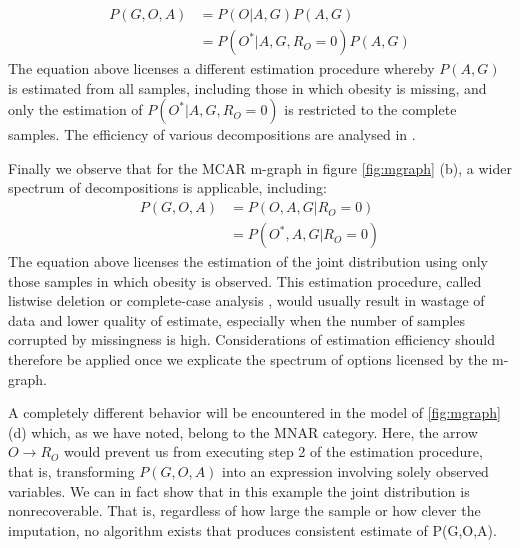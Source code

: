 \documentclass[12pt]{article}
\newcommand{\compos}{\mbox{$\bot\!\!\!\bot$}}
\begin{document}
	\begin{align*}
	P(G,O,A) &= P(O|A,G) P(A,G)\\
	&= P(O^*|A,G,R_O=0) P(A,G)	
	\end{align*}
	The equation above licenses a different estimation procedure whereby $P(A,G)$ is estimated from all samples, including those in which obesity is missing, and only the estimation of $P(O^*|A,G,R_O=0)$ is restricted to the complete samples. %
	The efficiency of various decompositions are analysed in \cite{mohan_learning, closedform}. 
	
	Finally we observe that for the MCAR m-graph in figure \ref{fig:mgraph} (b), a wider spectrum of decompositions is applicable, including:
	\begin{align*}
	P(G,O,A) &= P(O,A,G|R_O=0) \\
	&=	P(O^*,A,G|R_O=0)
	\end{align*}
	The equation above licenses the estimation of the joint distribution using only those samples in which obesity is observed. This  estimation procedure, called listwise deletion or complete-case analysis \citep{Rubin2},  would usually result in wastage of data and lower quality of estimate, especially when the number of samples corrupted by missingness is high. Considerations of estimation efficiency should therefore be applied once we explicate the spectrum of options licensed by the m-graph. 

		A completely different behavior will be encountered
		in the model of \ref{fig:mgraph} (d) which, as we have noted,
		belong to the MNAR category. Here, the arrow $O \to R_O$
		would prevent us from executing step 2  of the estimation
		procedure, that is, transforming $P(G,O,A)$ into an expression
		involving solely observed variables. We can in fact show
		that in this example the joint distribution is
		nonrecoverable. That is, regardless of
		how large the sample or how clever the imputation, 
		no algorithm exists that produces consistent estimate of
		P(G,O,A).
\end{document}
